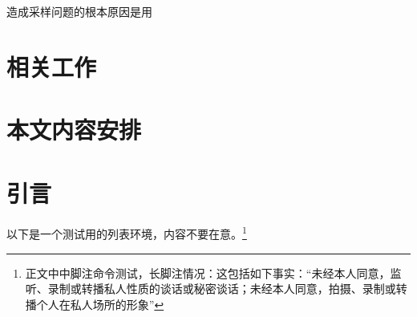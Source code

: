 造成采样问题的根本原因是用












\section{相关工作}

\section{本文内容安排}

\section{引言}
以下是一个测试用的列表环境，内容不要在意。\footnote{正文中中脚注命令测试，长脚注情况：这包括如下事实：“未经本人同意，监听、录制或转播私人性质的谈话或秘密谈话；未经本人同意，拍摄、录制或转播个人在私人场所的形象”}

